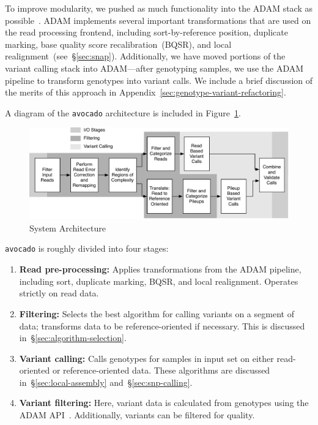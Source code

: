 \documentclass{acm_proc_article-sp}
\begin{document}
To improve modularity, we pushed as much functionality into the ADAM stack as possible~\cite{massie13}. ADAM implements several
important transformations that are used on the read processing frontend, including sort-by-reference position, duplicate marking, base
quality score recalibration~(BQSR), and local realignment~(see~\S\ref{sec:snap}). Additionally, we have moved portions of the variant
calling stack into ADAM---after genotyping samples, we use the ADAM pipeline to transform genotypes into variant calls. We include
a brief discussion of the merits of this approach in Appendix~\ref{sec:genotype-variant-refactoring}.

A diagram of the \texttt{avocado} architecture is included in Figure~\ref{fig:architecture}.

\begin{figure}[h]
\begin{center}
\includegraphics[width=0.9\linewidth]{avocado-architecture.pdf}
\end{center}
\caption{System Architecture}
\label{fig:architecture}
\end{figure}

\texttt{avocado} is roughly divided into four stages:

\begin{enumerate}
\item \textbf{Read pre-processing:} Applies transformations from the ADAM pipeline, including sort, duplicate marking, BQSR, and
local realignment. Operates strictly on read data.
\item \textbf{Filtering:} Selects the best algorithm for calling variants on a segment of data; transforms data to be reference-oriented
if necessary. This is discussed in~\S\ref{sec:algorithm-selection}.
\item \textbf{Variant calling:} Calls genotypes for samples in input set on either read-oriented or reference-oriented data. These
algorithms are discussed in~\S\ref{sec:local-assembly} and~\S\ref{sec:snp-calling}.
\item \textbf{Variant filtering:} Here, variant data is calculated from genotypes using the ADAM API~\cite{massie13}. Additionally,
variants can be filtered for quality.
\end{enumerate}
\end{document}
